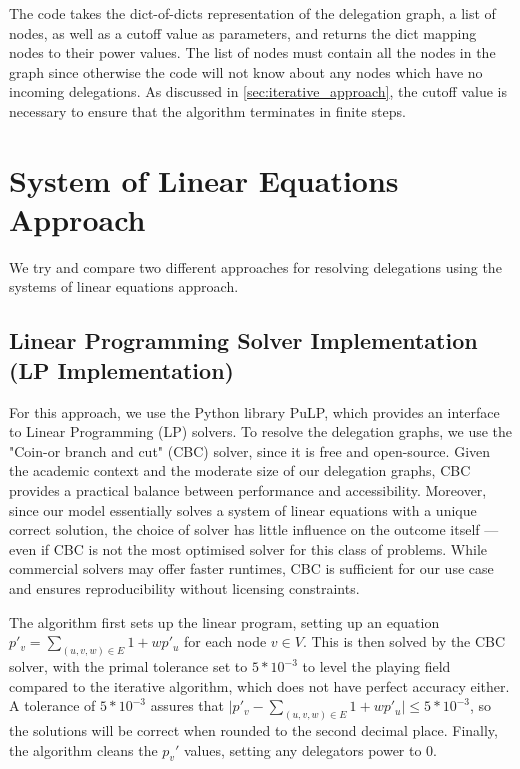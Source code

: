 The code takes the dict-of-dicts representation of the delegation graph, a list of nodes, as well as a cutoff value as parameters, and returns the dict mapping nodes to their power values. The list of nodes must contain all the nodes in the graph since otherwise the code will not know about any nodes which have no incoming delegations. As discussed in \cref{sec:iterative_approach}, the cutoff value is necessary to ensure that the algorithm terminates in finite steps.

\section{System of Linear Equations Approach}

We try and compare two different approaches for resolving delegations using the systems of linear equations approach.

\subsection{Linear Programming Solver Implementation (LP Implementation)}

For this approach, we use the Python library PuLP, which provides an interface to Linear Programming (LP) solvers.  To resolve the delegation graphs, we use the "Coin-or branch and cut" (CBC) solver, since it is free and open-source. Given the academic context and the moderate size of our delegation graphs, CBC provides a practical balance between performance and accessibility. Moreover, since our model essentially solves a system of linear equations with a unique correct solution, the choice of solver has little influence on the outcome itself — even if CBC is not the most optimised solver for this class of problems. While commercial solvers may offer faster runtimes, CBC is sufficient for our use case and ensures reproducibility without licensing constraints.

The algorithm first sets up the linear program, setting up an equation $p'_v = \sum_{(u, v, w) \in E} 1 + wp'_u$ for each node $v \in V$. This is then solved by the CBC solver, with the primal tolerance set to $5*10^{-3}$ to level the playing field compared to the iterative algorithm, which does not have perfect accuracy either. A tolerance of $5 * 10^{-3}$ assures that $\lvert p'_v -\sum_{(u, v, w) \in E} 1 + wp'_u \rvert \le 5*10^{-3}$, so the solutions will be correct when rounded to the second decimal place. Finally, the algorithm cleans the $p_v'$ values, setting any delegators power to 0. 

